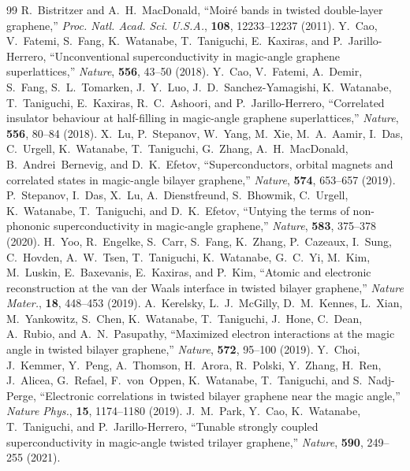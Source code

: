\documentclass[12pt,a4paper]{article}
\begin{document}
\FloatBarrier
\begin{thebibliography}{99}
	 R.~Bistritzer and A.~H.~MacDonald, ``Moir{\'e} bands in twisted double-layer graphene,'' \textit{Proc. Natl. Acad. Sci. U.S.A.}, \textbf{108}, 12233--12237 (2011).
	 Y.~Cao, V.~Fatemi, S.~Fang, K.~Watanabe, T.~Taniguchi, E.~Kaxiras, and P.~Jarillo-Herrero, ``Unconventional superconductivity in magic-angle graphene superlattices,'' \textit{Nature}, \textbf{556}, 43--50 (2018).
	 Y.~Cao, V.~Fatemi, A.~Demir, S.~Fang, S.~L.~Tomarken, J.~Y.~Luo, J.~D.~Sanchez-Yamagishi, K.~Watanabe, T.~Taniguchi, E.~Kaxiras, R.~C.~Ashoori, and P.~Jarillo-Herrero, ``Correlated insulator behaviour at half-filling in magic-angle graphene superlattices,'' \textit{Nature}, \textbf{556}, 80--84 (2018).
	 X.~Lu, P.~Stepanov, W.~Yang, M.~Xie, M.~A.~Aamir, I.~Das, C.~Urgell, K.~Watanabe, T.~Taniguchi, G.~Zhang, A.~H.~MacDonald, B.~Andrei~Bernevig, and D.~K.~Efetov, ``Superconductors, orbital magnets and correlated states in magic-angle bilayer graphene,'' \textit{Nature}, \textbf{574}, 653--657 (2019).
	 P.~Stepanov, I.~Das, X.~Lu, A.~Dienstfreund, S.~Bhowmik, C.~Urgell, K.~Watanabe, T.~Taniguchi, and D.~K.~Efetov, ``Untying the terms of non-phononic superconductivity in magic-angle graphene,'' \textit{Nature}, \textbf{583}, 375--378 (2020).
	 H.~Yoo, R.~Engelke, S.~Carr, S.~Fang, K.~Zhang, P.~Cazeaux, I.~Sung, C.~Hovden, A.~W.~Tsen, T.~Taniguchi, K.~Watanabe, G.~C.~Yi, M.~Kim, M.~Luskin, E.~Baxevanis, E.~Kaxiras, and P.~Kim, ``Atomic and electronic reconstruction at the van der Waals interface in twisted bilayer graphene,'' \textit{Nature Mater.}, \textbf{18}, 448--453 (2019).
	 A.~Kerelsky, L.~J.~McGilly, D.~M.~Kennes, L.~Xian, M.~Yankowitz, S.~Chen, K.~Watanabe, T.~Taniguchi, J.~Hone, C.~Dean, A.~Rubio, and A.~N.~Pasupathy, ``Maximized electron interactions at the magic angle in twisted bilayer graphene,'' \textit{Nature}, \textbf{572}, 95--100 (2019).
	 Y.~Choi, J.~Kemmer, Y.~Peng, A.~Thomson, H.~Arora, R.~Polski, Y.~Zhang, H.~Ren, J.~Alicea, G.~Refael, F.~von~Oppen, K.~Watanabe, T.~Taniguchi, and S.~Nadj-Perge, ``Electronic correlations in twisted bilayer graphene near the magic angle,'' \textit{Nature Phys.}, \textbf{15}, 1174--1180 (2019).
	 J.~M.~Park, Y.~Cao, K.~Watanabe, T.~Taniguchi, and P.~Jarillo-Herrero, ``Tunable strongly coupled superconductivity in magic-angle twisted trilayer graphene,'' \textit{Nature}, \textbf{590}, 249--255 (2021).

\end{thebibliography}
\end{document}
